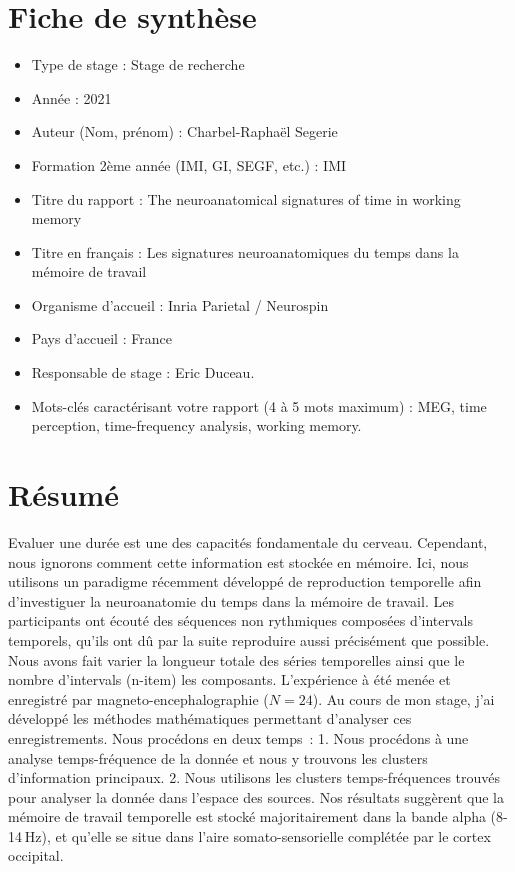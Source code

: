 \chapter*{\centering Fiche de synthèse}
\begin{itemize}
    \item Type de stage : Stage de recherche
    \item Année : 2021
    \item Auteur (Nom, prénom) : Charbel-Raphaël Segerie
    \item Formation 2ème année (IMI, GI, SEGF, etc.) : IMI
    \item Titre du rapport : The neuroanatomical signatures of time in working memory
    \item Titre en français : Les signatures neuroanatomiques du temps dans la mémoire de travail
    \item Organisme d’accueil : Inria Parietal / Neurospin
    \item Pays d’accueil : France
    \item Responsable de stage : Eric Duceau.
    \item Mots-clés caractérisant votre rapport (4 à 5 mots maximum) : MEG, time perception, time-frequency analysis, working memory.
\end{itemize}




\chapter*{\centering Résumé}

Evaluer une durée est une des capacités fondamentale du cerveau. Cependant, nous ignorons comment cette information est stockée en mémoire. Ici, nous utilisons un paradigme récemment développé de reproduction temporelle afin d'investiguer la neuroanatomie du temps dans la mémoire de travail. Les participants ont écouté des séquences non rythmiques composées d'intervals temporels, qu'ils ont dû par la suite reproduire aussi précisément que possible. Nous avons fait varier la longueur totale des séries temporelles ainsi que le nombre d'intervals (n-item) les composants. L'expérience à été menée et enregistré par magneto-encephalographie ($N=24$). Au cours de mon stage, j'ai développé les méthodes mathématiques permettant d'analyser ces enregistrements. Nous procédons en deux temps : 1. Nous procédons à une analyse temps-fréquence de la donnée et nous y trouvons les clusters d'information principaux. 2. Nous utilisons les clusters temps-fréquences trouvés pour analyser la donnée dans l'espace des sources. Nos résultats suggèrent que la mémoire de travail temporelle est stocké majoritairement dans la bande alpha (8-14 Hz), et qu'elle se situe dans l'aire somato-sensorielle complétée par le cortex occipital.

